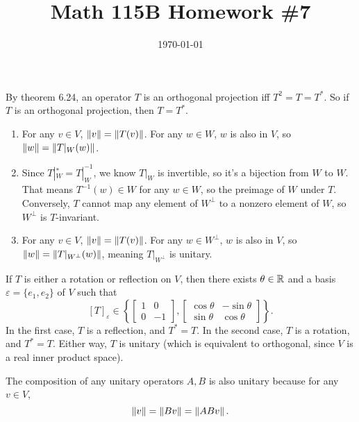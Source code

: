 \documentclass{article}
\date{\today}
\title{Math 115B Homework \#7}
\begin{document}
\maketitle

\begin{prob}
\end{prob}
By theorem 6.24, an operator $T$ is an orthogonal projection iff $T^2=T=T^*$. So if $T$ is an orthogonal projection, then $T=T^*$.

\bigskip
\par
\begin{prob}
\end{prob}
\begin{enumerate}[label=(\alph*)]
    \item For any $v \in V$, $\left\lVert v\right\rVert=\left\lVert T(v)\right\rVert$. For any $w \in W$, $w$ is also in $V$, so $\left\lVert w\right\rVert=\left\lVert T|_W(w)\right\rVert$.
    \item Since $T|_W^*=T|_W^{-1}$, we know $T|_W$ is invertible, so it's a bijection from $W$ to $W$. That means $T^{-1}(w) \in W$ for any $w \in W$, so the preimage of $W$ under $T$. Conversely, $T$ cannot map any element of $W^\perp$ to a nonzero element of $W$, so $W^\perp$ is $T$-invariant.
    \item For any $v \in V$, $\left\lVert v\right\rVert=\left\lVert T(v)\right\rVert$. For any $w \in W^\perp$, $w$ is also in $V$, so $\left\lVert w\right\rVert=\left\lVert T|_{W^\perp}(w)\right\rVert$, meaning $T|_{W^\perp}$ is unitary.
\end{enumerate}


\bigskip
\par
\begin{prob}
\end{prob}
If $T$ is either a rotation or reflection on $V$, then there exists $\theta \in \mathbb{R}$ and a basis $\varepsilon = \{ e_1, e_2 \}$ of $V$ such that
\[ [T]_\varepsilon \in \left\{ \begin{bmatrix}
        1 & 0 \\
        0 & -1
\end{bmatrix}, \begin{bmatrix}
        \cos \theta & - \sin \theta \\
        \sin \theta & \cos \theta
\end{bmatrix} \right\}. \]
In the first case, $T$ is a reflection, and $T^*=T$. In the second case, $T$ is a rotation, and $T^*=T$. Either way, $T$ is unitary (which is equivalent to orthogonal, since $V$ is a real inner product space).
\par
The composition of any unitary operators $A, B$ is also unitary because for any $v \in V$,
\[ \left\lVert v\right\rVert=\left\lVert Bv\right\rVert=\left\lVert ABv\right\rVert. \]
\end{document}
